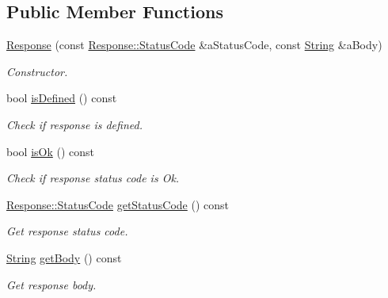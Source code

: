 \subsection*{Public Member Functions}
\begin{DoxyCompactItemize}
\item 
\hyperlink{classlibrary_1_1io_1_1ip_1_1tcp_1_1http_1_1_response_a3001c08e94962967caaabfc4ab204b2e}{Response} (const \hyperlink{classlibrary_1_1io_1_1ip_1_1tcp_1_1http_1_1_response_aa6406ad2157079c939b37c94806069f0}{Response\+::\+Status\+Code} \&a\+Status\+Code, const \hyperlink{namespacelibrary_1_1io_1_1ip_1_1tcp_1_1http_a1c435ea1e3614d52139da88a36632815}{String} \&a\+Body)
\begin{DoxyCompactList}\small\item\em Constructor. \end{DoxyCompactList}\item 
bool \hyperlink{classlibrary_1_1io_1_1ip_1_1tcp_1_1http_1_1_response_a8b3d9248f9b87d3d31373258202ca568}{is\+Defined} () const
\begin{DoxyCompactList}\small\item\em Check if response is defined. \end{DoxyCompactList}\item 
bool \hyperlink{classlibrary_1_1io_1_1ip_1_1tcp_1_1http_1_1_response_a1d09beb5c9b0c9a5a16a106f6b092055}{is\+Ok} () const
\begin{DoxyCompactList}\small\item\em Check if response status code is Ok. \end{DoxyCompactList}\item 
\hyperlink{classlibrary_1_1io_1_1ip_1_1tcp_1_1http_1_1_response_aa6406ad2157079c939b37c94806069f0}{Response\+::\+Status\+Code} \hyperlink{classlibrary_1_1io_1_1ip_1_1tcp_1_1http_1_1_response_a55725cfcb7ebb735606d01550bbc631f}{get\+Status\+Code} () const
\begin{DoxyCompactList}\small\item\em Get response status code. \end{DoxyCompactList}\item 
\hyperlink{namespacelibrary_1_1io_1_1ip_1_1tcp_1_1http_a1c435ea1e3614d52139da88a36632815}{String} \hyperlink{classlibrary_1_1io_1_1ip_1_1tcp_1_1http_1_1_response_a0fa35f1c350420165c52de2c1ad1c7a5}{get\+Body} () const
\begin{DoxyCompactList}\small\item\em Get response body. \end{DoxyCompactList}\end{DoxyCompactItemize}
